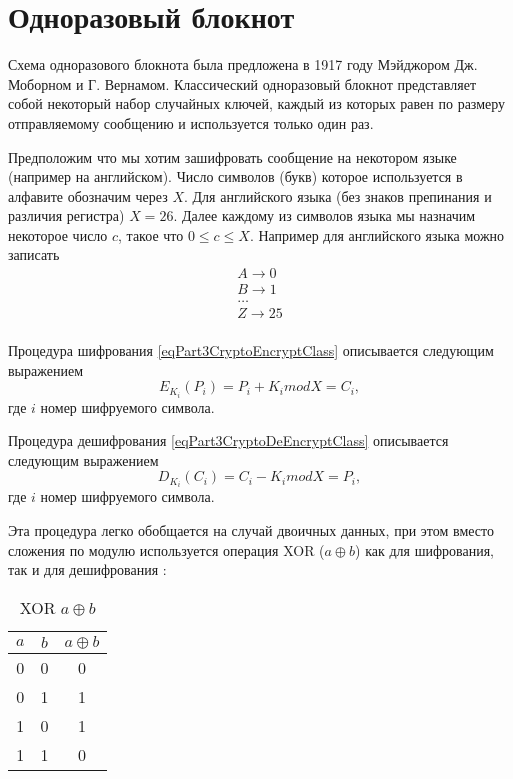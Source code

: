 \section{Одноразовый блокнот}
Схема одноразового блокнота была предложена в 1917 году Мэйджором
Дж. Моборном и Г. Вернамом. Классический одноразовый блокнот представляет собой
некоторый набор случайных ключей, каждый из которых равен по размеру
отправляемому сообщению и используется только один раз. 

Предположим что мы хотим зашифровать сообщение на некотором языке
(например на английском). Число символов (букв) которое используется в
алфавите обозначим через $X$. Для английского языка (без знаков
препинания и различия регистра) $X = 26$. Далее каждому из символов
языка мы назначим некоторое число $c$, такое что $0 \le c \le
X$. Например для английского языка можно записать
\begin{equation}
\begin{array}{c}
A \rightarrow 0 \\
B \rightarrow 1 \\
\dots \\
Z \rightarrow 25 \\
\end{array}
\nonumber
\end{equation}
  
Процедура шифрования \eqref{eqPart3CryptoEncryptClass} описывается
следующим выражением
\begin{equation}
E_{K_i}\left(P_i\right) = P_i + K_i mod X = C_i,
\label{eqPart3CryptoEncryptVernam}
\end{equation}
где $i$ номер шифруемого символа.

Процедура дешифрования \eqref{eqPart3CryptoDeEncryptClass} описывается
следующим выражением
\begin{equation}
D_{K_i}\left(C_i\right) = C_i - K_i mod X = P_i,
\label{eqPart3CryptoDeEncryptVernam}
\end{equation}
где $i$ номер шифруемого символа.

Эта процедура легко обобщается на случай двоичных данных, при этом
вместо сложения по модулю используется операция XOR ($a \oplus b$) как
для шифрования, так и для дешифрования :
\begin{table}
\centering
\begin{tabular}{|c|c|c|}
\hline
$a$ & $b$ & $a \oplus b$ \\ \hline
0  & 0 & 0 \\
0  & 1 & 1 \\
1  & 0 & 1 \\
1  & 1 & 0 \\ \hline
\end{tabular}
\caption{XOR $a \oplus b$}
\label{tblXOR}
\end{table}

